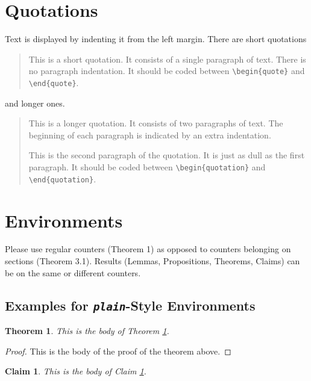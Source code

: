 \documentclass[te,nameyear,final,supplement]{econsocart}
\theoremstyle{plain}
\newtheorem{theorem}{Theorem}
\newtheorem{claim}{Claim}
\theoremstyle{definition}
\begin{document}
\section{Quotations}

Text is displayed by indenting it from the left margin. There are short quotations
\begin{quote}
This is a short quotation.  It consists of a
single paragraph of text.  There is no paragraph
indentation. It should be coded between \verb|\begin{quote}| and \verb|\end{quote}|.
\end{quote}
and longer ones.
\begin{quotation}
This is a longer quotation.  It consists of two paragraphs
of text.  The beginning of each paragraph is indicated
by an extra indentation.

This is the second paragraph of the quotation.  It is just
as dull as the first paragraph. It should be coded between \verb|\begin{quotation}| and \verb|\end{quotation}|.
\end{quotation}

\section{Environments}

Please use regular counters (Theorem 1) as opposed to counters belonging on sections (Theorem 3.1). Results (Lemmas, Propositions, Theorems, Claims) can be on the same or different counters.

\subsection{Examples for \emph{\texttt{plain}}-Style Environments}

\begin{theorem}\label{th1}
This is the body of Theorem \ref{th1}.
\end{theorem}


\begin{proof}
This is the body of the proof of the theorem above.
\end{proof}

\begin{claim}\label{cl1}
This is the body of Claim \ref{cl1}. 
\end{claim}
\end{document}
